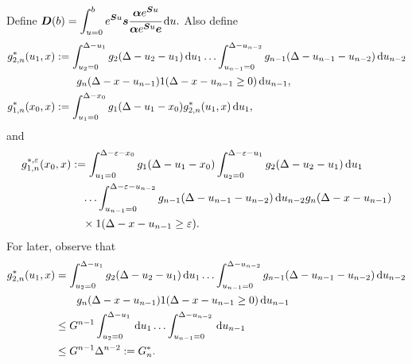 Define \(\displaystyle\boldsymbol D(b) = \int_{u=0}^be^{\boldsymbol Su}\boldsymbol s \cfrac{\boldsymbol\alpha e^{\boldsymbol S u}}{\boldsymbol \alpha e^{\boldsymbol S u}\boldsymbol e} \, \mathrm{d} u.\) Also define 
	\begin{align}
		g^*_{2,n}(u_1,x) &:= \int_{u_2=0}^{\Delta-u_1}g_2(\Delta - u_2 - u_1)\, \mathrm{d} u_1 \dots \nonumber 
            	\int_{u_{n-1}=0}^{\Delta-u_{n-2}} g_{n-1}(\Delta - u_{n-1} - u_{n-2}) \, \mathrm{d} u_{n-2}
            	\\&\qquad{}g_{n}(\Delta - x-u_{n-1})1(\Delta-x-u_{n-1}\geq0)\, \mathrm{d} u_{n-1},
		\\g^*_{1,n}(x_0,x) &:= \int_{u_1=0}^{\Delta-x_0}g_1(\Delta - u_1 - x_0)g^*_{2,n}(u_1,x)\, \mathrm{d} u_1,
	\end{align}
	and 
	\begin{align}
		g^{*,\varepsilon}_{1,n}(x_0,x) &:= \int_{u_1=0}^{\Delta-\varepsilon-x_0}g_1(\Delta - u_1 - x_0)
		\int_{u_2=0}^{\Delta-\varepsilon-u_1}g_2(\Delta - u_2 - u_1)\, \mathrm{d} u_1  \nonumber 
		\\&\quad\hdots 
            	\int_{u_{n-1}=0}^{\Delta-\varepsilon-u_{n-2}} g_{n-1}(\Delta - u_{n-1} - u_{n-2}) \, \mathrm{d} u_{n-2}
            	g_{n}(\Delta-x-u_{n-1}) \nonumber 
		\\&\quad{}\times 1(\Delta-x-u_{n-1}\geq\varepsilon).
	\end{align}
	For later, observe that 
	\begin{align}
		g^*_{2,n}(u_1,x) &= \int_{u_2=0}^{\Delta-u_1}g_2(\Delta - u_2 - u_1)\, \mathrm{d} u_1 \dots \nonumber 
            	\int_{u_{n-1}=0}^{\Delta-u_{n-2}} g_{n-1}(\Delta - u_{n-1} - u_{n-2}) \, \mathrm{d} u_{n-2}
            	\\&\qquad{}g_{n}(\Delta - x-u_{n-1})1(\Delta-x-u_{n-1}\geq0)\, \mathrm{d} u_{n-1} \nonumber
		\\&\leq G^{n-1}\int_{u_2=0}^{\Delta-u_1}\, \mathrm{d} u_1 \dots\nonumber
            	\int_{u_{n-1}=0}^{\Delta-u_{n-2}}  \, \mathrm{d} u_{n-1}
		\\&\leq G^{n-1}\Delta^{n-2}:=G^*_n.
	\end{align}

